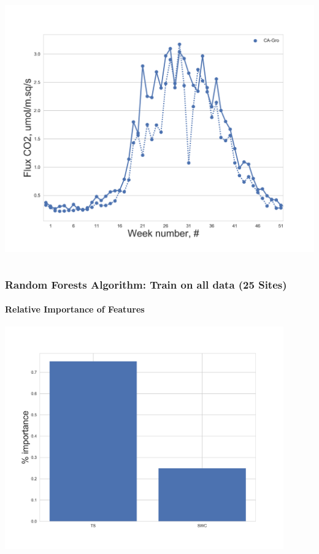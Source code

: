 \documentclass{beamer}
\begin{document}
\begin{frame}
\begin{columns}[t]
\includegraphics[width=\textwidth]{F_ML_train_all/0.png}
\end{columns}

\end{frame}

\begin{frame}
\frametitle{Random Forests Algorithm: Train on all data (25 Sites)}
\framesubtitle{Relative Importance of Features}
\centering
\includegraphics[width=0.9\textwidth]{importance_3.png}\\
\end{frame}
\end{document}

